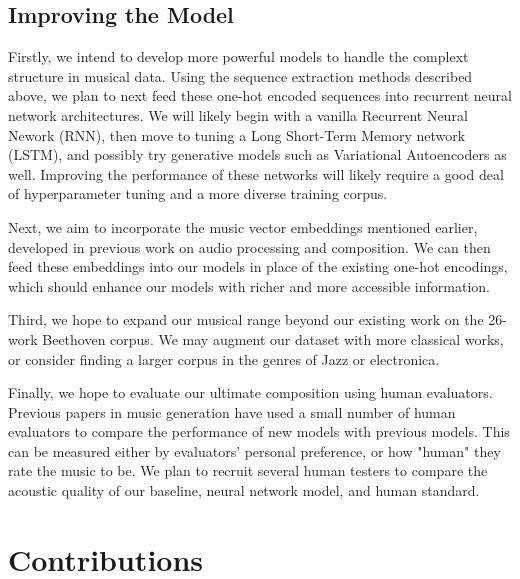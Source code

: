 \documentclass[twoside,twocolumn]{article}
\begin{document}
\subsection{Improving the Model}

Firstly, we intend to develop more powerful models to handle the complext structure in musical data. Using the sequence extraction methods described above, we plan to next feed these one-hot encoded sequences into recurrent neural network architectures. We will likely begin with a vanilla Recurrent Neural Nework (RNN), then move to tuning a Long Short-Term Memory network (LSTM), and possibly try generative models such as Variational Autoencoders as well. Improving the performance of these networks will likely require a good deal of hyperparameter tuning and a more diverse training corpus.

Next, we aim to incorporate the music vector embeddings mentioned earlier, developed in previous work on audio processing and composition. We can then feed these embeddings into our models in place of the existing one-hot encodings, which should enhance our models with richer and more accessible information.

Third, we hope to expand our musical range beyond our existing work on the 26-work Beethoven corpus. We may augment our dataset with more classical works, or consider finding a larger corpus in the genres of Jazz or electronica.

Finally, we hope to evaluate our ultimate composition using human evaluators. Previous papers in music generation have used a small number of human evaluators to compare the performance of new models with previous models. This can be measured either by evaluators' personal preference, or how "human" they rate the music to be. We plan to recruit several human testers to compare the acoustic quality of our baseline, neural network model, and human standard.



\section{Contributions}







\end{document}

